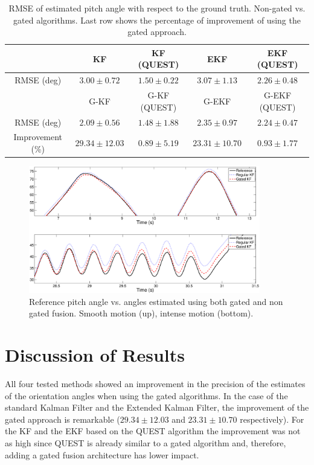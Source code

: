 \documentclass{IOS-Book-Article}
\begin{document}
\begin{table}[t]
\centering
\caption{RMSE of estimated pitch angle with respect to the ground truth. Non-gated vs. gated algorithms. Last row shows the percentage of improvement of using the gated approach.}
\label{tab:results}
\footnotesize
\begin{tabular}{ | c | c | c | c | c |}
\hline
					&	KF				&	KF (QUEST)		&	EKF				& 	EKF (QUEST) 	\\\hline
RMSE (deg)			&	$3.00\pm0.72$	&	$1.50\pm0.22$	&	$3.07\pm1.13$	&	$2.26\pm0.48$	\\\hline
					&	G-KF			&	G-KF (QUEST)	&	G-EKF			& 	G-EKF (QUEST) 	\\\hline
RMSE (deg)			&	$2.09\pm0.56$	&	$1.48\pm1.88$	&	$2.35\pm0.97$	&	$2.24\pm0.47$	\\\hline
Improvement (\%) 	&	$29.34\pm12.03$ &   $0.89\pm5.19$	&	$23.31\pm10.70$&	$0.93\pm1.77$	\\
\hline
\end{tabular}
\end{table}

\begin{figure}[t]
\centering
\includegraphics[width=0.9\textwidth]{figures/angles.eps}
\caption{Reference pitch angle vs. angles estimated using both gated and non gated fusion. Smooth motion (up), intense motion (bottom).}
\label{fig:angles}
\end{figure}

\section{Discussion of Results}
\label{sec:discussion}
\indent All four tested methods showed an improvement in the precision of the estimates of the orientation angles when using the gated algorithms. In the case of the standard Kalman Filter and the Extended Kalman Filter, the improvement of the gated approach is remarkable ($29.34\pm12.03$ and $23.31\pm10.70$ respectively). For the KF and the EKF based on the QUEST algorithm the improvement was not as high since QUEST is already similar to a gated algorithm and, therefore, adding a gated fusion architecture has lower impact. 
\end{document}
